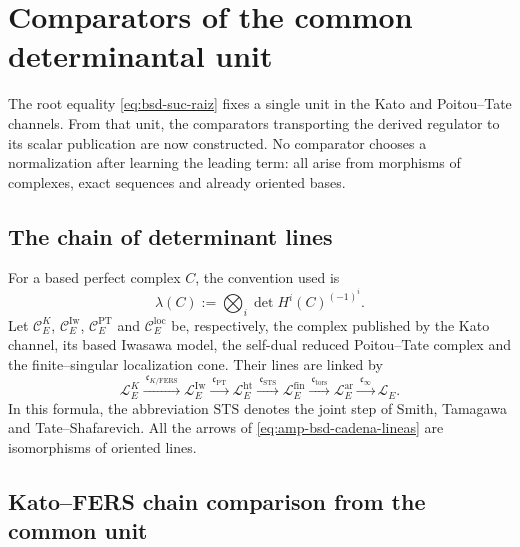 
\section{Comparators of the common determinantal unit}
\label{sec:amp-bsd-comparadores}

The root equality \eqref{eq:bsd-suc-raiz} fixes a single unit in the Kato
and Poitou--Tate channels. From that unit, the comparators
transporting the derived regulator to its scalar publication
are now constructed. No comparator chooses a normalization after learning the
leading term: all arise from morphisms of complexes, exact
sequences and already oriented bases.

\subsection{The chain of determinant lines}
\label{subsec:amp-bsd-lineas}

For a based perfect complex \(C\), the convention used is
\begin{equation}\label{eq:amp-bsd-linea-determinante}
 \lambda(C):=\bigotimes_i
 \det H^i(C)^{(-1)^i}.
\end{equation}
Let \(\mathcal C_E^K\), \(\mathcal C_E^{\mathrm{Iw}}\),
\(\mathcal C_E^{\mathrm{PT}}\) and \(\mathcal C_E^{\mathrm{loc}}\) be,
respectively, the complex published by the Kato channel, its based
Iwasawa model, the self-dual reduced Poitou--Tate complex and the finite--singular
localization cone. Their lines are linked by
\begin{equation}\label{eq:amp-bsd-cadena-lineas}
 \mathcal L_E^K
 \xrightarrow{\ \mathfrak c_{K/\mathrm{FERS}}\ }
 \mathcal L_E^{\mathrm{Iw}}
 \xrightarrow{\ \mathfrak c_{\mathrm{PT}}\ }
 \mathcal L_E^{\mathrm{ht}}
 \xrightarrow{\ \mathfrak c_{\mathrm{STS}}\ }
 \mathcal L_E^{\mathrm{fin}}
 \xrightarrow{\ \mathfrak c_{\mathrm{tors}}\ }
 \mathcal L_E^{\mathrm{ar}}
 \xrightarrow{\ \mathfrak c_{\infty}\ }
 \mathcal L_E.
\end{equation}
In this formula, the abbreviation \(\mathrm{STS}\) denotes the joint step of
Smith, Tamagawa and Tate--Shafarevich. All the arrows of
\eqref{eq:amp-bsd-cadena-lineas} are isomorphisms of oriented lines.

\subsection{Kato--FERS chain comparison from the common unit}
\label{subsec:amp-bsd-comparacion-cadenas-kato-fers}

